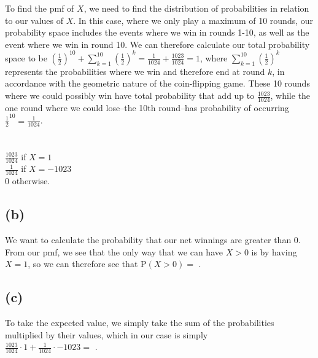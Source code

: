 \documentclass{article}
\begin{document}
{To find the pmf of $X$, we need to find the distribution of probabilities in relation to our values of $X$. In this case, where we only play a maximum of 10 rounds, our probability space includes the events where we win in rounds 1-10, as well as the event where we win in round 10. We can therefore calculate our total probability space to be $(\frac{1}{2})^{10} + \sum_{k=1}^{10} (\frac{1}{2})^k = \frac{1}{1024} + \frac{1023}{1024} = 1$, where $\sum_{k=1}^{10} (\frac{1}{2})^k$ represents the probabilities where we win and therefore end at round $k$, in accordance with the geometric nature of the coin-flipping game. These 10 rounds where we could possibly win have total probability that add up to $\frac{1023}{1024}$, while the one round where we could lose--the 10th round--has probability of occurring $\frac{1}{2}^{10} = \frac{1}{1024}$. \\ \\
 \\
$\frac{1023}{1024}$ if $X = 1$\\ 
$\frac{1}{1024}$ if $X = -1023$\\ 
0 otherwise.


\subsection*{(b)}
We want to calculate the probability that our net winnings are greater than 0. From our pmf, we see that the only way that we can have $X > 0$ is by having $X = 1$, so we can therefore see that P$(X > 0) =$ .

\subsection*{(c)}
To take the expected value, we simply take the sum of the probabilities multiplied by their values, which in our case is simply \\
$\frac{1023}{1024} \cdot 1 + \frac{1}{1024} \cdot -1023 = $ .

}
\end{document}
